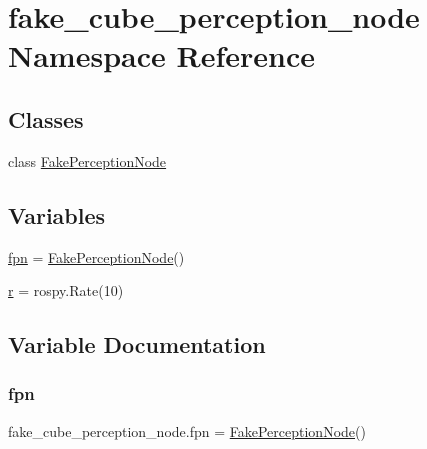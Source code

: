 \hypertarget{namespacefake__cube__perception__node}{}\section{fake\+\_\+cube\+\_\+perception\+\_\+node Namespace Reference}
\label{namespacefake__cube__perception__node}
\subsection*{Classes}
\begin{DoxyCompactItemize}
\item 
class \hyperlink{classfake__cube__perception__node_1_1FakePerceptionNode}{Fake\+Perception\+Node}
\end{DoxyCompactItemize}
\subsection*{Variables}
\begin{DoxyCompactItemize}
\item 
\hyperlink{namespacefake__cube__perception__node_a884c359a5cfb68aa706a9a0506d1ae2c}{fpn} = \hyperlink{classfake__cube__perception__node_1_1FakePerceptionNode}{Fake\+Perception\+Node}()
\item 
\hyperlink{namespacefake__cube__perception__node_a36e88703ab69fd35065e8a8d9344903e}{r} = rospy.\+Rate(10)
\end{DoxyCompactItemize}


\subsection{Variable Documentation}
\mbox{\label{namespacefake__cube__perception__node_a884c359a5cfb68aa706a9a0506d1ae2c}} 
\subsubsection{\texorpdfstring{fpn}{fpn}}
{\footnotesize\ttfamily fake\+\_\+cube\+\_\+perception\+\_\+node.\+fpn = \hyperlink{classfake__cube__perception__node_1_1FakePerceptionNode}{Fake\+Perception\+Node}()}



